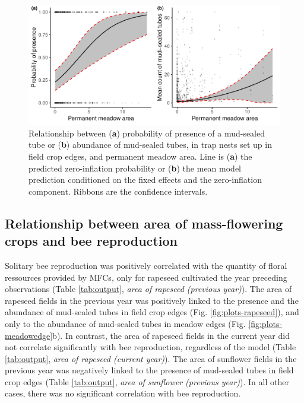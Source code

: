\documentclass[smallextended]{svjour3}       %
\begin{document}
\begin{figure}
\includegraphics[width=1\linewidth]{solitary_bees_files/figure-latex/plots-meadow-1} \caption{Relationship between (\textbf{a}) probability of presence of a mud-sealed tube or (\textbf{b}) abundance of mud-sealed tubes, in trap nests set up in field crop edges, and permanent meadow area. Line is (\textbf{a}) the predicted zero-inflation probability or (\textbf{b}) the mean model prediction conditioned on the fixed effects and the zero-inflation component. Ribbons are the confidence intervals.}\label{fig:plots-meadow}
\end{figure}

\hypertarget{relationship-between-area-of-mass-flowering-crops-and-bee-reproduction}{%
\subsection{Relationship between area of mass-flowering crops and bee
reproduction}\label{relationship-between-area-of-mass-flowering-crops-and-bee-reproduction}}

Solitary bee reproduction was positively correlated with the quantity of
floral ressources provided by MFCs, only for rapeseed cultivated the
year preceding observations (Table \ref{tab:output}, \emph{area of
rapeseed (previous year)}). The area of rapeseed fields in the previous
year was positively linked to the presence and the abundance of
mud-sealed tubes in field crop edges (Fig. \ref{fig:plots-rapeseed}),
and only to the abundance of mud-sealed tubes in meadow edges (Fig.
\ref{fig:plots-meadowedge}b). In contrast, the area of rapeseed fields
in the current year did not correlate significantly with bee
reproduction, regardless of the model (Table \ref{tab:output},
\emph{area of rapeseed (current year)}). The area of sunflower fields in
the previous year was negatively linked to the presence of mud-sealed
tubes in field crop edges (Table \ref{tab:output}, \emph{area of
sunflower (previous year)}). In all other cases, there was no
significant correlation with bee reproduction.
\end{document}

